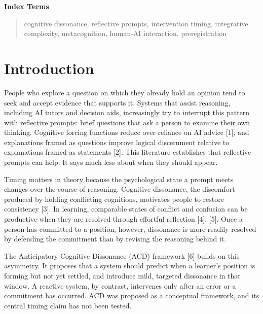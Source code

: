\documentclass[12pt,letterpaper]{article}
\begin{document}
\vspace{-4pt}\begin{center}{\small\bfseries Index Terms}\end{center}
\vspace{-6pt}
\begin{quote}\small
\hspace{1em}cognitive dissonance, reflective prompts, intervention timing, integrative complexity, metacognition, human-AI interaction, preregistration
\end{quote}
\vspace{4pt}

\section{Introduction}
People who explore a question on which they already hold an opinion tend to seek and accept evidence that supports it. Systems that assist reasoning, including AI tutors and decision aids, increasingly try to interrupt this pattern with reflective prompts: brief questions that ask a person to examine their own thinking. Cognitive forcing functions reduce over-reliance on AI advice [1], and explanations framed as questions improve logical discernment relative to explanations framed as statements [2]. This literature establishes that reflective prompts can help. It says much less about when they should appear.

Timing matters in theory because the psychological state a prompt meets changes over the course of reasoning. Cognitive dissonance, the discomfort produced by holding conflicting cognitions, motivates people to restore consistency [3]. In learning, comparable states of conflict and confusion can be productive when they are resolved through effortful reflection [4], [5]. Once a person has committed to a position, however, dissonance is more readily resolved by defending the commitment than by revising the reasoning behind it.

The Anticipatory Cognitive Dissonance (ACD) framework [6] builds on this asymmetry. It proposes that a system should predict when a learner's position is forming but not yet settled, and introduce mild, targeted dissonance in that window. A reactive system, by contrast, intervenes only after an error or a commitment has occurred. ACD was proposed as a conceptual framework, and its central timing claim has not been tested.
\end{document}

